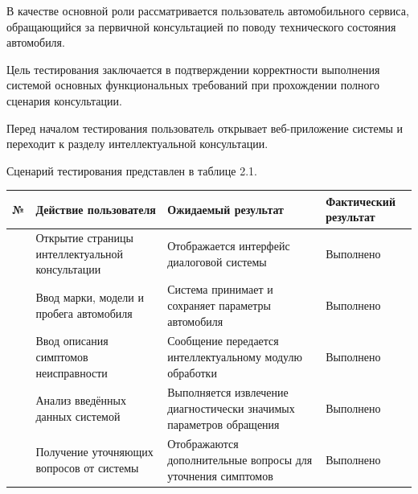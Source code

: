 \documentclass[14pt,a4paper]{extarticle}
\newcounter{none}
\numberwithin{figure}{section}
\numberwithin{table}{section}
\begin{document}
В качестве основной роли рассматривается пользователь автомобильного
сервиса, обращающийся за первичной консультацией по поводу технического
состояния автомобиля.

Цель тестирования заключается в подтверждении корректности выполнения
системой основных функциональных требований при прохождении полного
сценария консультации.

Перед началом тестирования пользователь открывает веб-приложение системы
и переходит к разделу интеллектуальной консультации.

Сценарий тестирования представлен в таблице 2.1.

{\def\LTcaptype{none} %
\begin{longtable}[]{@{}
  >{\centering\arraybackslash}p{}
  >{\centering\arraybackslash}p{}
  >{\centering\arraybackslash}p{}
  >{\centering\arraybackslash}p{}@{}}
\toprule\noalign{}
\begin{minipage}[b]{\linewidth}\centering
\textbf{№}
\end{minipage} & \begin{minipage}[b]{\linewidth}\centering
\textbf{Действие пользователя}
\end{minipage} & \begin{minipage}[b]{\linewidth}\centering
\textbf{Ожидаемый результат}
\end{minipage} & \begin{minipage}[b]{\linewidth}\centering
\textbf{Фактический результат}
\end{minipage} \\
\midrule\noalign{}
\endhead
\bottomrule\noalign{}
\endlastfoot
1 & Открытие страницы интеллектуальной консультации & Отображается
интерфейс диалоговой системы & Выполнено \\
2 & Ввод марки, модели и пробега автомобиля & Система принимает и
сохраняет параметры автомобиля & Выполнено \\
3 & Ввод описания симптомов неисправности & Сообщение передается
интеллектуальному модулю обработки & Выполнено \\
4 & Анализ введённых данных системой & Выполняется извлечение
диагностически значимых параметров обращения & Выполнено \\
5 & Получение уточняющих вопросов от системы & Отображаются
дополнительные вопросы для уточнения симптомов & Выполнено \\

\end{longtable}}
\end{document}
